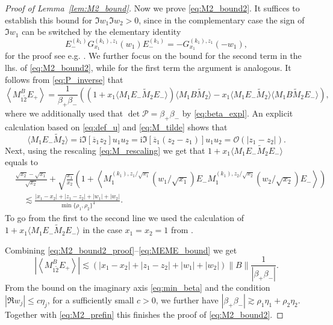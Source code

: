 \documentclass[10pt]{amsart}
\numberwithin{equation}{section}
\newcommand{\ii}{\mathrm{i}}
\begin{document}
\begin{proof}[Proof of Lemma~\ref{lem:M2_bound}]
Now we prove \eqref{eq:M2_bound2}. It suffices to establish this bound for $\Im w_1\Im w_2>0$, since in the complementary case the sign of $\Im w_1$ can be switched by the elementary identity
\begin{equation}
E_-^{(k_1)}G_{x_1}^{(k_1),z_1}(w_1)E_-^{(k_1)} = - G_{x_1}^{(k_1),z_1}(-w_1),
\label{eq:w_switch}
\end{equation}
for the proof see e.g. \cite[Eq.(7.52)]{hyperuniformity}. We further focus on the bound for the second term in the lhs. of \eqref{eq:M2_bound2}, while for the first term the argument is analogous. It follows from \eqref{eq:P_inverse} that
\begin{equation}
\left\langle M_{1\widetilde{2}}^BE_+\right\rangle = \frac{1}{\beta_+\beta_-} \left(\left(1+x_1\langle M_1E_-\widetilde{M}_2E_-\rangle\right)\langle M_1B \widetilde{M}_2\rangle - x_1 \langle M_1E_-\widetilde{M}_2\rangle \langle M_1B\widetilde{M}_2E_-\rangle\right),
\end{equation}
\label{eq:M2_bound2_proof}
where we additionally used that $\det \mathcal{P}=\beta_+\beta_-$ by \eqref{eq:beta_expl}. An explicit calculation based on \eqref{eq:def_u} and \eqref{eq:M_tilde} shows that
\begin{equation}
\langle M_1E_-\widetilde{M}_2\rangle = \ii\Im [\overline{z}_1z_2] u_1u_2 = \ii\Im [\overline{z}_1(z_2-z_1)]u_1u_2 = \mathcal{O}(|z_1-z_2|).
\end{equation}
Next, using the rescaling \eqref{eq:M_rescaling} we get that $1+x_1\langle M_1E_-\widetilde{M}_2E_-\rangle$ equals to
\begin{equation}
\begin{split}
&\frac{\sqrt{x_2}-\sqrt{x_1}}{\sqrt{x_2}} + \sqrt{\frac{x_1}{x_2}}\left(1+\left\langle M_1^{(k_1),z_1/\sqrt{x_1}}(w_1/\sqrt{x_1}) E_- M_1^{(k_1),z_2/\sqrt{x_2}}(w_2/\sqrt{x_2})E_-\right\rangle\right)\\
&\quad \lesssim \frac{|x_1-x_2|+|z_1-z_2|+|w_1|+|w_2|}{\min\{\rho_1,\rho_2\}^4}.
\end{split}
\label{eq:MEME_bound}
\end{equation}
To go from the first to the second line we used the calculation of $1+x_1\langle M_1E_-\widetilde{M}_2E_-\rangle$ in the case $x_1=x_2=1$ from \cite[Eq.(A.22)]{hyperuniformity}.

Combining \eqref{eq:M2_bound2_proof}--\eqref{eq:MEME_bound} we get
\begin{equation}
\left\vert\left\langle M_{1\widetilde{2}}^BE_+\right\rangle \right\vert \lesssim \left(|x_1-x_2|+|z_1-z_2|+|w_1|+|w_2|\right)\|B\|\frac{1}{|\beta_+\beta_-|}.
\label{eq:M2_prefin}
\end{equation}
From the bound on the imaginary axis \eqref{eq:min_beta} and the condition $|\Re w_j|\le c\eta_j$, for a sufficiently small $c>0$, we further have $|\beta_+\beta_-|\gtrsim \rho_1\eta_1+\rho_2\eta_2$. Together with \eqref{eq:M2_prefin} this finishes the proof of \eqref{eq:M2_bound2}.
\end{proof}
\end{document}
